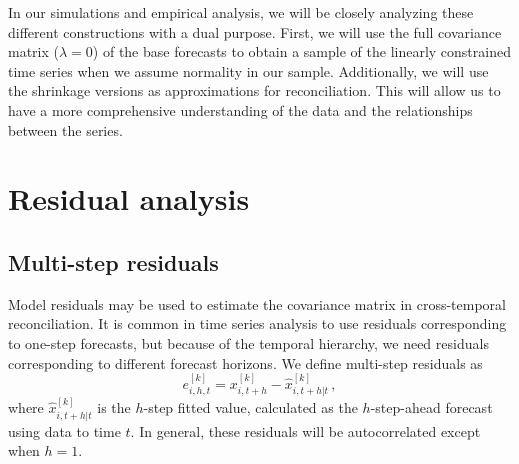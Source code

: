 \documentclass[a4paper,11pt]{article}
\theoremstyle{definition}
\begin{document}
In our simulations and empirical analysis, we will be closely analyzing these different constructions with a dual purpose. First, we will use the full covariance matrix ($\lambda = 0$) of the base forecasts to obtain a sample of the linearly constrained time series when we assume normality in our sample. Additionally, we will use the shrinkage versions as approximations for reconciliation. This will allow us to have a more comprehensive understanding of the data and the relationships between the series.

\section{Residual analysis}\label{sec:res}

\subsection{Multi-step residuals} \label{ssec:multi_res}

Model residuals may be used to estimate the covariance matrix in cross-temporal reconciliation. It is common in time series analysis to use residuals corresponding to one-step forecasts, but because of the temporal hierarchy, we need residuals corresponding to different forecast horizons. We define multi-step residuals as
$$
	e_{i,h,t}^{[k]} = x_{i,t+h}^{[k]} - \widehat{x}_{i,t+h|t}^{[k]}\,, %
$$
where $\widehat{x}_{i,t+h|t}^{[k]}$ is the $h$-step fitted value, calculated as the $h$-step-ahead forecast using data to time $t$. In general, these residuals will be autocorrelated except when $h=1$.
\end{document}
